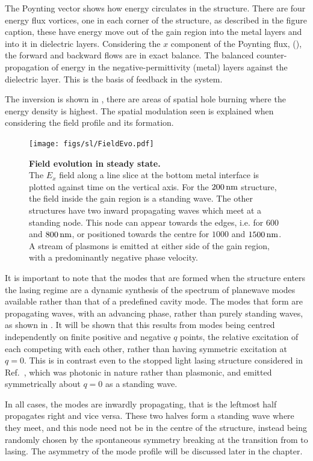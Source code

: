 The Poynting vector shows how energy circulates in the structure.
There are four energy flux vortices, one in each corner of the structure, as
described in the figure caption, these have energy move out of the gain region
into the metal layers and into it in dielectric layers.
Considering the $x$ component of the Poynting flux, (),
the forward and backward flows are in exact balance.
The balanced counter-propagation of energy in the negative-permittivity (metal)
layers against the dielectric layer.
This is the basis of feedback in the system.

The inversion is shown in , there are areas of spatial hole
burning where the energy density is highest.
The spatial modulation seen is explained when considering the field profile and
its formation.

\begin{figure}
 \texttt{[image: figs/sl/FieldEvo.pdf]}
 \caption[Field evolution in steady state]{\label{fig:FieldEvo}
\textbf{Field evolution in steady state.}\small\\
The $E_x$ field along a line slice at the bottom metal interface is plotted
against time on the vertical axis.
For the $200\operatorname{nm}$ structure, the field inside the gain region is a standing wave.
The other structures have two inward propagating waves which meet at a standing
node.
This node can appear towards the edges, i.e. for $600$ and $800\operatorname{nm}$, or
positioned towards the centre for $1000$ and $1500\operatorname{nm}$.
A stream of plasmons is emitted at either side of the gain region, with a
predominantly negative phase velocity.
}
\end{figure}

It is important to note that the modes that are formed when the structure
enters the lasing regime are a dynamic synthesis of the spectrum of planewave
modes available rather than that of a predefined cavity mode.
The modes that form are propagating waves, with an advancing phase, rather than
purely standing waves, as shown in .
It will be shown that this results from modes being centred independently on
finite positive and negative $q$ points, the relative excitation of
each competing with each other, rather than having symmetric excitation at
$q=0$.
This is in contrast even to the stopped light lasing structure considered in
Ref.~\cite{Pickering2014}, which was photonic in nature rather than plasmonic,
and emitted symmetrically about $q=0$ as a standing wave.

In all cases, the modes are inwardly propagating, that is the leftmost half
propagates right and vice versa.
These two halves form a standing wave where they meet, and this node need not be
in the centre of the structure, instead being randomly chosen by the spontaneous
symmetry breaking at the transition from \ase to lasing.
The asymmetry of the mode profile will be discussed later in the chapter.

